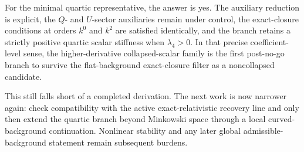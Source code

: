 \documentclass[11pt]{article}
\begin{document}
For the minimal quartic representative, the answer is yes. The auxiliary reduction is explicit, the \(Q\)- and \(U\)-sector auxiliaries remain under control, the exact-closure conditions at orders \(k^0\) and \(k^2\) are satisfied identically, and the branch retains a strictly positive quartic scalar stiffness when \(\lambda_4>0\). In that precise coefficient-level sense, the higher-derivative collapsed-scalar family is the first post-no-go branch to survive the flat-background exact-closure filter as a noncollapsed candidate.

This still falls short of a completed derivation. The next work is now narrower again: check compatibility with the active exact-relativistic recovery line and only then extend the quartic branch beyond Minkowski space through a local curved-background continuation. Nonlinear stability and any later global admissible-background statement remain subsequent burdens.
\end{document}
